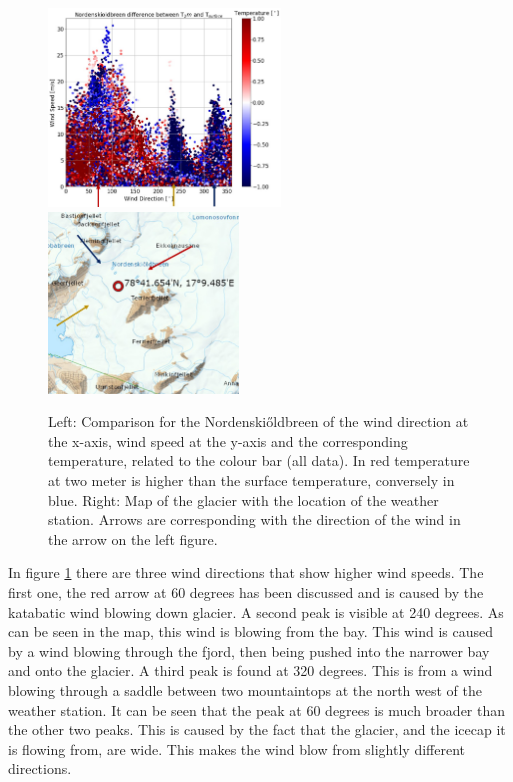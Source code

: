 \documentclass[11pt]{report}
\begin{document}
\begin{figure}[H]
\includegraphics[scale=1, width=0.55\textwidth]{ulve-WS-WD.jpg}
\includegraphics[scale=1, width=0.45\textwidth]{norde-WS-WD-rose-2.jpg}
\caption{Left: Comparison for the Nordenski\H{o}ldbreen of the wind direction at the x-axis, wind speed at the y-axis and the corresponding temperature, related to the colour bar (all data). In red temperature at two meter is higher than the surface temperature, conversely in blue. Right: Map \cite{NPI} of the glacier with the location of the weather station. Arrows are corresponding with the direction of the wind in the arrow on the left figure.}
\label{fig:PRnorde}
\end{figure}

\newpage
In figure \ref{fig:PRnorde} there are three wind directions that show higher wind speeds. The first one, the red arrow at 60 degrees has been discussed and is caused by the katabatic wind blowing down glacier. A second peak is visible at 240 degrees. As can be seen in the map, this wind is blowing from the bay. This wind is caused by a wind blowing through the fjord, then being pushed into the narrower bay and onto the glacier. A third peak is found at 320 degrees. This is from a wind blowing through a saddle between two mountaintops at the north west of the weather station. It can be seen that the peak at 60 degrees is much broader than the other two peaks. This is caused by the fact that the glacier, and the icecap it is flowing from, are wide. This makes the wind blow from slightly different directions. 
\end{document}
